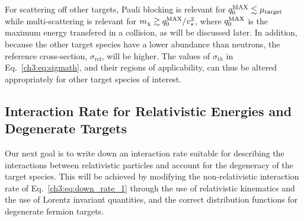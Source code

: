 For scattering off other targets, Pauli blocking is relevant for $q_0^{\rm MAX} \lesssim  \mu_{\rm target}$ 
while multi-scattering is relevant for $m_\chi \gtrsim q_0^{\rm MAX}/v_{\star}^2$, where $q_0^{\rm MAX}$ is the maximum energy transfered in a collision, as will be discussed later.  In addition, because the other target species have a lower abundance than neutrons, the reference cross-section, $\sigma_\mathrm{ref}$, will be higher. The values of $\sigma_{th}$ in Eq.~\ref{ch3:eq:sigmath}, and their regions of applicability, can thus be altered appropriately for other target species of interest.

\subsection{Interaction Rate for Relativistic Energies and Degenerate Targets}
\label{ch3:subsec:int_rate_degen_rel}

Our next goal is to write down an interaction rate suitable for describing the interactions between relativistic particles and account for the degeneracy of the target species. This will be achieved by modifying the non-relativistic interaction rate of Eq.~\ref{ch3:eq:down_rate_1} through the use of relativistic kinematics and the use of Lorentz invariant quantities, and the correct distribution functions for degenerate fermion targets.

